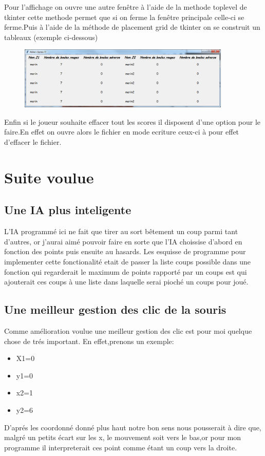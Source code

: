 \documentclass{article}
\begin{document}
Pour l'affichage on ouvre une autre fenêtre à l'aide de la methode toplevel de tkinter cette methode permet que si on ferme la fenêtre principale celle-ci se ferme.Puis à l'aide de la méthode de placement grid de tkinter on se construit un tableaux (exemple ci-dessous) 

\begin{figure}[!h]
\centerline{\includegraphics[width=0.9\textwidth]{images/Affichage_score.png}}
\vspace{1cm}
\caption{}
\end{figure}

Enfin si le joueur souhaite effacer tout les scores il disposent d'une option pour le faire.En effet on ouvre alors le fichier en mode ecriture ceux-ci à pour effet d'effacer le fichier.
\section{Suite voulue}
\subsection{Une IA plus inteligente}
L'IA programmé ici ne fait que tirer au sort bêtement un coup parmi tant d'autres, or j'aurai aimé pouvoir faire en sorte que l'IA choissise d'abord en fonction des points puis ensuite au hasards.
Les esquisse de programme pour implementer cette fonctionalité etait de passer la liste coups possible dans une fonction qui regarderait le maximum de points rapporté par un coups est qui ajouterait ces coups à une liste dans laquelle serai pioché un coups pour joué.
\newpage
\subsection{Une meilleur gestion des clic de la souris}
Comme amélioration voulue une meilleur gestion des clic est pour moi quelque chose de trés important.
En effet,prenons un exemple:
\begin{itemize}
\item X1=0
\item y1=0
\item x2=1
\item y2=6
\end{itemize}
D'aprés les coordonné donné plus haut notre bon sens nous pousserait à dire que, malgré un petits écart sur les x, le mouvement soit vers le bas,or pour mon programme il interpreterait ces point comme étant un coup vers la droite.
\end{document}
